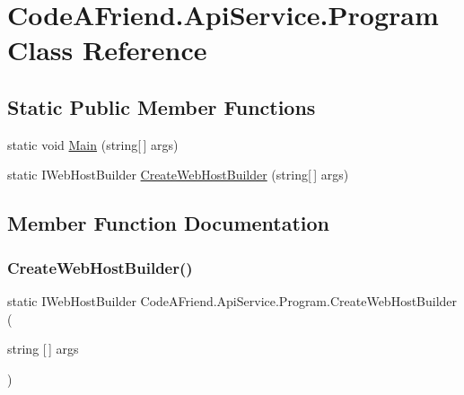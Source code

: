 \hypertarget{class_code_a_friend_1_1_api_service_1_1_program}{}\section{Code\+A\+Friend.\+Api\+Service.\+Program Class Reference}
\label{class_code_a_friend_1_1_api_service_1_1_program}
\subsection*{Static Public Member Functions}
\begin{DoxyCompactItemize}
\item 
static void \mbox{\hyperlink{class_code_a_friend_1_1_api_service_1_1_program_ab8576d734dee8553d034caa706a0d54c}{Main}} (string\mbox{[}$\,$\mbox{]} args)
\item 
static I\+Web\+Host\+Builder \mbox{\hyperlink{class_code_a_friend_1_1_api_service_1_1_program_a14dd777c9ede20d6d0ef28d833963981}{Create\+Web\+Host\+Builder}} (string\mbox{[}$\,$\mbox{]} args)
\end{DoxyCompactItemize}


\subsection{Member Function Documentation}
\mbox{\label{class_code_a_friend_1_1_api_service_1_1_program_a14dd777c9ede20d6d0ef28d833963981}} 
\subsubsection{\texorpdfstring{Create\+Web\+Host\+Builder()}{CreateWebHostBuilder()}}
{\footnotesize\ttfamily static I\+Web\+Host\+Builder Code\+A\+Friend.\+Api\+Service.\+Program.\+Create\+Web\+Host\+Builder (\begin{DoxyParamCaption}\item[{string \mbox{[}$\,$\mbox{]}}]{args }\end{DoxyParamCaption})\hspace{0.3cm}{\ttfamily [static]}}

